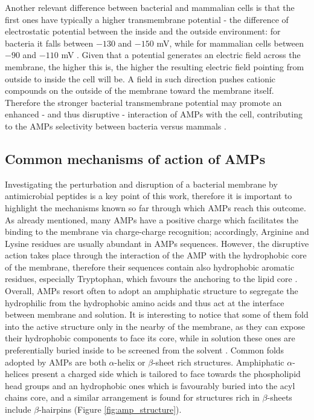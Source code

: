 Another relevant difference between bacterial and mammalian cells is that the first ones have typically a higher transmembrane potential - the difference of electrostatic potential between the inside and the outside environment: for bacteria it falls between $-130$ and $-150$ mV, while for mammalian cells between $-90$ and $-110$ mV \citep{Yeaman2003,Matsuzaki2009,Ebenhan2014}.
%
Given that a potential generates an electric field across the membrane, the higher this is, the higher the resulting electric field pointing from outside to inside the cell will be. A field in such direction pushes cationic compounds on the outside of the membrane toward the membrane itself. Therefore the stronger bacterial transmembrane potential may promote an enhanced - and thus disruptive - interaction of AMPs with the cell, contributing to the AMPs selectivity between bacteria versus mammals \citep{Yeaman2003}.


\subsection{Common mechanisms of action of AMPs} \label{AMP_mechs}
Investigating the perturbation and disruption of a bacterial membrane by antimicrobial peptides is a key point of this work, therefore it is important to highlight the mechanisms known so far through which AMPs reach this outcome.
%
As already mentioned, many AMPs have a positive charge which facilitates the binding to the membrane via charge-charge recognition; accordingly, Arginine and Lysine residues are usually abundant in AMPs sequences. However, the disruptive action takes place through the interaction of the AMP with the hydrophobic core of the membrane, therefore their sequences contain also hydrophobic aromatic residues, especially Tryptophan, which favours the anchoring to the lipid core \citep{Chan2006}.
%
Overall, AMPs resort often to adopt an amphiphatic structure to segregate the hydrophilic from the hydrophobic amino acids and thus act at the interface between membrane and solution. It is interesting to notice that some of them fold into the active structure only in the nearby of the membrane, as they can expose their hydrophobic components to face its core, while in solution these ones are preferentially buried inside to be screened from the solvent \citep{Nguyen2011}.
%
Common folds adopted by AMPs are both $\alpha$-helix or $\beta$-sheet rich structures. Amphiphatic $\alpha$-helices present a charged side which is tailored to face towards the phospholipid head groups and an hydrophobic ones which is favourably buried into the acyl chains core,
%
and a similar arrangement is found for structures rich in $\beta$-sheets include $\beta$-hairpins (Figure \ref{fig:amp_structure}).



